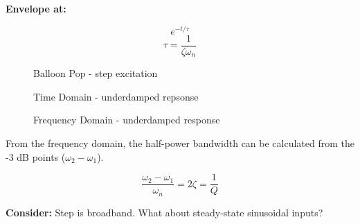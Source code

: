 {\bf Envelope at:}

\begin{equation} e^{-t/\tau} \end{equation}
\begin{equation} \tau = \dfrac{1}{\zeta \omega_n} \end{equation}

\begin{figure}[htb]
\begin{minipage}[b]{0.5\linewidth} 
\begin{center}
\caption{Balloon Pop - step excitation}
\end{center}


\end{minipage}
\begin{minipage}[b]{0.5\linewidth} 
\begin{center}
\caption{Time Domain - underdamped repsonse}
\end{center}

\end{minipage}
\end{figure}


\begin{figure}[htb]
\begin{center}
\caption{Frequency Domain - underdamped response}
\end{center}
\end{figure}

From the frequency domain, the half-power bandwidth can be calculated from the -3 dB points ($\omega_2 - \omega_1$).

\begin{equation} \dfrac{\omega_2 - \omega_1}{\omega_n} = 2\zeta = \dfrac{1}{Q} \end{equation}

{\bf Consider:} Step is broadband.  What about steady-state sinusoidal inputs?


